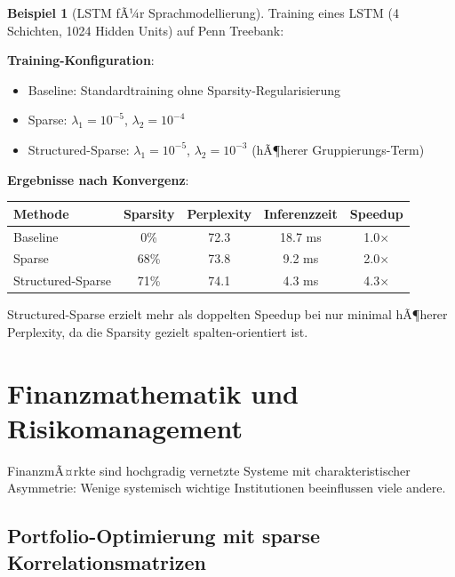 ﻿\documentclass[a4paper,12pt]{report}
\theoremstyle{definition}
\newtheorem{beispiel}{Beispiel}
\begin{document}
	\begin{beispiel}[LSTM fÃ¼r Sprachmodellierung]
		Training eines LSTM (4 Schichten, 1024 Hidden Units) auf Penn Treebank:
		
		\textbf{Training-Konfiguration}:
		\begin{itemize}
			\item Baseline: Standardtraining ohne Sparsity-Regularisierung
			\item Sparse: $\lambda_1 = 10^{-5}$, $\lambda_2 = 10^{-4}$
			\item Structured-Sparse: $\lambda_1 = 10^{-5}$, $\lambda_2 = 10^{-3}$ (hÃ¶herer Gruppierungs-Term)
		\end{itemize}
		
		\textbf{Ergebnisse nach Konvergenz}:
		\begin{center}
			\begin{tabular}{|l|c|c|c|c|}
				\hline
				\textbf{Methode} & \textbf{Sparsity} & \textbf{Perplexity} & \textbf{Inferenzzeit} & \textbf{Speedup} \\
				\hline
				Baseline & 0\% & 72.3 & 18.7 ms & 1.0$\times$ \\
				Sparse & 68\% & 73.8 & 9.2 ms & 2.0$\times$ \\
				Structured-Sparse & 71\% & 74.1 & 4.3 ms & 4.3$\times$ \\
				\hline
			\end{tabular}
		\end{center}
		
		Structured-Sparse erzielt mehr als doppelten Speedup bei nur minimal hÃ¶herer Perplexity, da die Sparsity gezielt spalten-orientiert ist.
	\end{beispiel}
	
	\section{Finanzmathematik und Risikomanagement}
	
	FinanzmÃ¤rkte sind hochgradig vernetzte Systeme mit charakteristischer Asymmetrie: Wenige systemisch wichtige Institutionen beeinflussen viele andere.
	
	\subsection{Portfolio-Optimierung mit sparse Korrelationsmatrizen}
	
\end{document}
